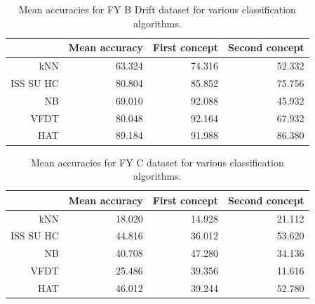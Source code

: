 \begin{table}[h]
\centering
\begin{tabular}{r|rrr}
          & Mean accuracy & First concept & Second concept \\ \hline
kNN       & 63.324        & 74.316                      & 52.332                       \\
ISS SU HC & 80.804        & 85.852                      & 75.756                       \\
NB        & 69.010        & 92.088                      & 45.932                       \\
VFDT      & 80.048        & 92.164                      & 67.932                       \\
HAT       & 89.184        & 91.988                      & 86.380                       
\end{tabular}
\caption{Mean accuracies for FY B Drift dataset for various classification algorithms.}
\label{Table:Feature_Drift_FY_B_Drift}
\end{table}

\begin{table}[h]
\centering
\begin{tabular}{r|rrr}
          & Mean accuracy & First concept & Second concept \\ \hline
kNN       & 18.020        & 14.928                      & 21.112                       \\
ISS SU HC & 44.816        & 36.012                      & 53.620                        \\
NB        & 40.708        & 47.280                      & 34.136                       \\
VFDT      & 25.486        & 39.356                      & 11.616                       \\
HAT       & 46.012        & 39.244                      & 52.780                       
\end{tabular}
\caption{Mean accuracies for FY C dataset for various classification algorithms.}
\label{Table:Feature_Drift_FY_C}
\end{table}

